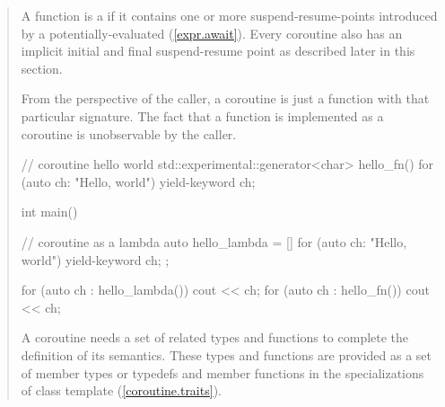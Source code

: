\begin{quote}
\pnum
A function is a  if it contains
one or more suspend-resume-points introduced by a potentially-evaluated  (\ref{expr.await}).
Every coroutine
also has an implicit initial and final suspend-resume point as described later in this section. 


\pnum
\enternote
From the perspective of the caller, a coroutine is just a function with that particular signature. The fact that a function is implemented as a coroutine is unobservable by the caller. 
\exitnote

\pnum
\enterexample
\begin{codeblock}
  // coroutine hello world
  std::experimental::generator<char> hello_fn() {
    for (auto ch: "Hello, world") yield-keyword ch;
  }
  
  int main() {
    // coroutine as a lambda
    auto hello_lambda = []{ for (auto ch: "Hello, world") yield-keyword ch; };
    
    for (auto ch : hello_lambda()) cout << ch;
    for (auto ch : hello_fn()) cout << ch;
  }
\end{codeblock}
\exitexample

\pnum
A coroutine needs a set of related types and functions
to complete the definition of its semantics.
These types and functions are provided as a set of member types or typedefs
and member functions in the specializations of class template
 (\ref{coroutine.traits}). 


\end{quote}
